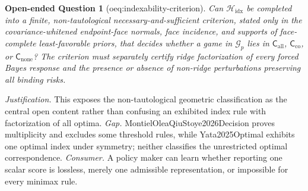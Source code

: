 \documentclass{article}
\newtheorem{openendedquestion}{Open-ended Question}
\begin{document}
\begin{openendedquestion}[oeq:indexability-criterion]\label{oeq:indexability-criterion}
Can \(\mathscr H_{\mathrm{idx}}\) be completed into a finite, non-tautological necessary-and-sufficient criterion, stated only in the covariance-whitened endpoint-face normals, face incidence, and supports of face-complete least-favorable priors, that decides whether a game in \(\mathcal G_p\) lies in \(\mathsf C_{\mathrm{all}}\), \(\mathsf C_{\mathrm{co}}\), or \(\mathsf C_{\mathrm{none}}\)? The criterion must separately certify ridge factorization of every forced Bayes response and the presence or absence of non-ridge perturbations preserving all binding risks.
\end{openendedquestion}
\par\smallskip\noindent \textit{Justification.} This exposes the non-tautological geometric classification as the central open content rather than confusing an exhibited index rule with factorization of all optima. \textit{Gap.} MontielOleaQiuStoye2026Decision proves multiplicity and excludes some threshold rules, while Yata2025Optimal exhibits one optimal index under symmetry; neither classifies the unrestricted optimal correspondence. \textit{Consumer.} A policy maker can learn whether reporting one scalar score is lossless, merely one admissible representation, or impossible for every minimax rule.
\end{document}
